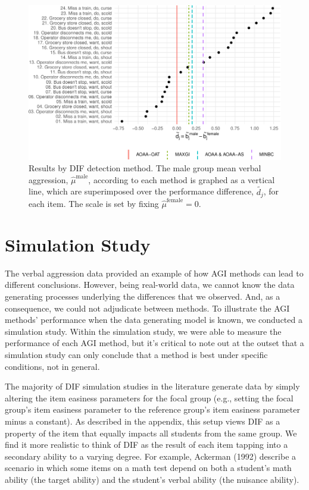 \documentclass[
  english,
  man,floatsintext]{apa6}
\begin{document}
\begin{figure}[h]

{\centering \includegraphics{paper_apa_files/figure-latex/summary-1}

}

\caption{Results by DIF detection method. The male group mean verbal aggression, $\hat \mu^\text{male}$, according to each method is graphed as a vertical line, which are superimposed over the performance difference, $\tilde {d_j}$, for each item. The scale is set by fixing $\hat \mu^\text{female} = 0$.}\label{fig:summary}
\end{figure}

\hypertarget{simulation-study}{%
\section{Simulation Study}\label{simulation-study}}

The verbal aggression data provided an example of how AGI methods can lead to different conclusions. However, being real-world data, we cannot know the data generating processes underlying the differences that we observed. And, as a consequence, we could not adjudicate between methods. To illustrate the AGI methods' performance when the data generating model is known, we conducted a simulation study. Within the simulation study, we were able to measure the performance of each AGI method, but it's critical to note out at the outset that a simulation study can only conclude that a method is best under specific conditions, not in general.

The majority of DIF simulation studies in the literature generate data by simply altering the item easiness parameters for the focal group (e.g., setting the focal group's item easiness parameter to the reference group's item easiness parameter minus a constant). As described in the appendix, this setup views DIF as a property of the item that equally impacts all students from the same group. We find it more realistic to think of DIF as the result of each item tapping into a secondary ability to a varying degree. For example, Ackerman (1992) describe a scenario in which some items on a math test depend on both a student's math ability (the target ability) and the student's verbal ability (the nuisance ability).
\end{document}
